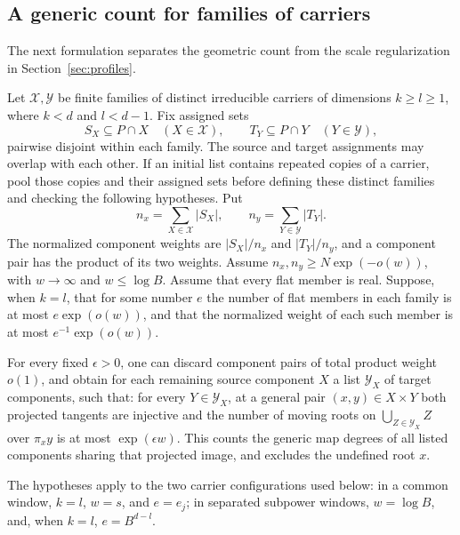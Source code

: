 \subsection{A generic count for families of carriers}

The next formulation separates the geometric count from the scale
regularization in Section~\ref{sec:profiles}.

\begin{lemma}\label{geo:generic-depth}
Let $\mathcal X,\mathcal Y$ be finite families of distinct irreducible
carriers of dimensions $k\ge l\ge1$, where $k<d$ and $l<d-1$.
Fix assigned sets
\[
 S_X\subseteq P\cap X\quad(X\in\mathcal X),\qquad
 T_Y\subseteq P\cap Y\quad(Y\in\mathcal Y),
\]
pairwise disjoint within each family.  The source and target assignments
may overlap with each other.  If an initial list contains repeated copies
of a carrier, pool those copies and their assigned sets before defining
these distinct families and checking the following hypotheses.  Put
\[
 n_x=\sum_{X\in\mathcal X}|S_X|,\qquad
 n_y=\sum_{Y\in\mathcal Y}|T_Y|.
\]
The normalized component weights are $|S_X|/n_x$ and $|T_Y|/n_y$,
and a component pair has the product of its two weights.
Assume $n_x,n_y\ge N\exp(-o(w))$, with $w\to\infty$ and
$w\le\log B$.  Assume that every flat member is real. Suppose, when
$k=l$, that for some number $e$ the number of flat members in each
family is at most $e\exp(o(w))$, and that the normalized weight of
each such member is at most $e^{-1}\exp(o(w))$.

For every fixed $\epsilon>0$, one can discard component pairs of
total product weight $o(1)$, and obtain for each remaining source
component $X$ a list $\mathcal Y_X$ of target components, such that:
for every $Y\in\mathcal Y_X$, at a general pair $(x,y)\in X\times Y$
both projected tangents are injective and the number of moving roots
on $\bigcup_{Z\in\mathcal Y_X}Z$ over $\pi_xy$ is at most
$\exp(\epsilon w)$. This counts the generic map degrees of all listed
components sharing that projected image, and excludes the undefined
root $x$.

The hypotheses apply to the two carrier configurations used below:
in a common window, $k=l$, $w=s$, and $e=e_j$; in separated subpower
windows, $w=\log B$, and, when $k=l$, $e=B^{d-l}$.
\end{lemma}

